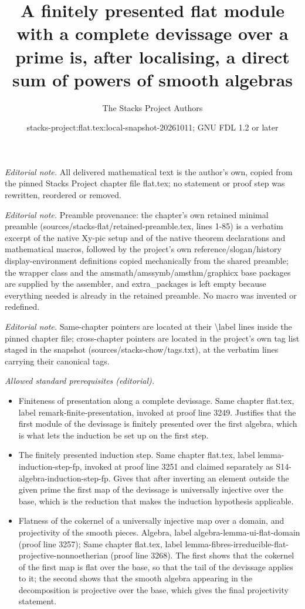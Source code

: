 \documentclass[10pt,a4paper]{amsart}
\title{A finitely presented flat module with a complete devissage over a prime is, after localising, a direct sum of powers of smooth algebras}
\author{The Stacks Project Authors}
\date{stacks-project:flat.tex:local-snapshot-20261011; GNU FDL 1.2 or later}
\theoremstyle{plain}
\theoremstyle{definition}
\theoremstyle{remark}
\numberwithin{equation}{subsection}
\begin{document}
\maketitle
\noindent\textit{Editorial note.} All delivered mathematical text is the author's own, copied from the pinned Stacks Project chapter file flat.tex; no statement or proof step was rewritten, reordered or removed.\par\medskip
\noindent\textit{Editorial note.} Preamble provenance: the chapter's own retained minimal preamble (sources/stacks-flat/retained-preamble.tex, lines 1-85) is a verbatim excerpt of the native Xy-pic setup and of the native theorem declarations and mathematical macros, followed by the project's own reference/slogan/history display-environment definitions copied mechanically from the shared preamble; the wrapper class and the amsmath/amssymb/amsthm/graphicx base packages are supplied by the assembler, and extra\_packages is left empty because everything needed is already in the retained preamble. No macro was invented or redefined.\par\medskip
\noindent\textit{Editorial note.} Same-chapter pointers are located at their \textbackslash{}label lines inside the pinned chapter file; cross-chapter pointers are located in the project's own tag list staged in the snapshot (sources/stacks-chow/tags.txt), at the verbatim lines carrying their canonical tags.\par\medskip
\noindent\textit{Allowed standard prerequisites (editorial).}\begin{itemize}
\item Finiteness of presentation along a complete devissage. Same chapter flat.tex, label remark-finite-presentation, invoked at proof line 3249. Justifies that the first module of the devissage is finitely presented over the first algebra, which is what lets the induction be set up on the first step.
\item The finitely presented induction step. Same chapter flat.tex, label lemma-induction-step-fp, invoked at proof line 3251 and claimed separately as S14-algebra-induction-step-fp. Gives that after inverting an element outside the given prime the first map of the devissage is universally injective over the base, which is the reduction that makes the induction hypothesis applicable.
\item Flatness of the cokernel of a universally injective map over a domain, and projectivity of the smooth pieces. Algebra, label algebra-lemma-ui-flat-domain (proof line 3257); Same chapter flat.tex, label lemma-fibres-irreducible-flat-projective-nonnoetherian (proof line 3268). The first shows that the cokernel of the first map is flat over the base, so that the tail of the devissage applies to it; the second shows that the smooth algebra appearing in the decomposition is projective over the base, which gives the final projectivity statement.
\end{itemize}\medskip
\end{document}

